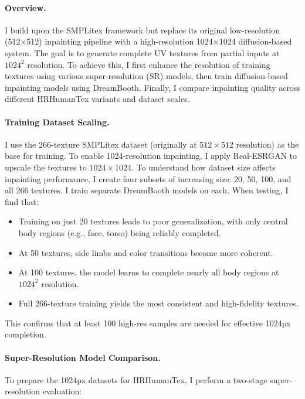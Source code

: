 \paragraph{Overview.} I build upon the SMPLitex framework but replace its original low-resolution (512×512) inpainting pipeline with a high-resolution 1024×1024 diffusion-based system. The goal is to generate complete UV textures from partial inputs at $1024^2$ resolution. To achieve this, I first enhance the resolution of training textures using various super-resolution (SR) models, then train diffusion-based inpainting models using DreamBooth. Finally, I compare inpainting quality across different HRHumanTex variants and dataset scales.

\paragraph{Training Dataset Scaling.}
I use the 266-texture SMPLitex dataset (originally at $512\times512$ resolution) as the base for training. To enable 1024-resolution inpainting, I apply Real-ESRGAN to upscale the textures to $1024\times1024$. To understand how dataset size affects inpainting performance, I create four subsets of increasing size: 20, 50, 100, and all 266 textures. I train separate DreamBooth models on each. When testing, I find that:

\begin{itemize}
    \item Training on just 20 textures leads to poor generalization, with only central body regions (e.g., face, torso) being reliably completed.
    \item At 50 textures, side limbs and color transitions become more coherent.
    \item At 100 textures, the model learns to complete nearly all body regions at $1024^2$ resolution.
    \item Full 266-texture training yields the most consistent and high-fidelity textures.
\end{itemize}

This confirms that at least 100 high-res samples are needed for effective 1024px completion.

\paragraph{Super-Resolution Model Comparison.}
To prepare the 1024px datasets for HRHumanTex, I perform a two-stage super-resolution evaluation:


